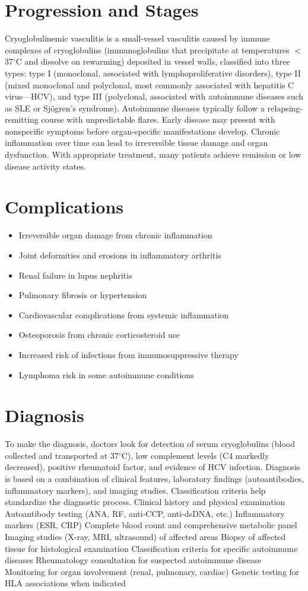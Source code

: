 \section{Progression and Stages}
Cryoglobulinemic vasculitis is a small-vessel vasculitis caused by immune complexes of cryoglobulins (immunoglobulins that precipitate at temperatures $<$37$^\circ$C and dissolve on rewarming) deposited in vessel walls, classified into three types: type I (monoclonal, associated with lymphoproliferative disorders), type II (mixed monoclonal and polyclonal, most commonly associated with hepatitis C virus---HCV), and type III (polyclonal, associated with autoimmune diseases such as SLE or Sjögren's syndrome). Autoimmune diseases typically follow a relapsing-remitting course with unpredictable flares. Early disease may present with nonspecific symptoms before organ-specific manifestations develop. Chronic inflammation over time can lead to irreversible tissue damage and organ dysfunction. With appropriate treatment, many patients achieve remission or low disease activity states.
\section{Complications}
\begin{itemize}[noitemsep]
  \item Irreversible organ damage from chronic inflammation
  \item Joint deformities and erosions in inflammatory arthritis
  \item Renal failure in lupus nephritis
  \item Pulmonary fibrosis or hypertension
  \item Cardiovascular complications from systemic inflammation
  \item Osteoporosis from chronic corticosteroid use
  \item Increased risk of infections from immunosuppressive therapy
  \item Lymphoma risk in some autoimmune conditions
\end{itemize}
\section{Diagnosis}
To make the diagnosis, doctors look for detection of serum cryoglobulins (blood collected and transported at 37$^\circ$C), low complement levels (C4 markedly decreased), positive rheumatoid factor, and evidence of HCV infection. Diagnosis is based on a combination of clinical features, laboratory findings (autoantibodies, inflammatory markers), and imaging studies. Classification criteria help standardize the diagnostic process. Clinical history and physical examination Autoantibody testing (ANA, RF, anti-CCP, anti-dsDNA, etc.) Inflammatory markers (ESR, CRP) Complete blood count and comprehensive metabolic panel Imaging studies (X-ray, MRI, ultrasound) of affected areas Biopsy of affected tissue for histological examination Classification criteria for specific autoimmune diseases Rheumatology consultation for suspected autoimmune disease Monitoring for organ involvement (renal, pulmonary, cardiac) Genetic testing for HLA associations when indicated

